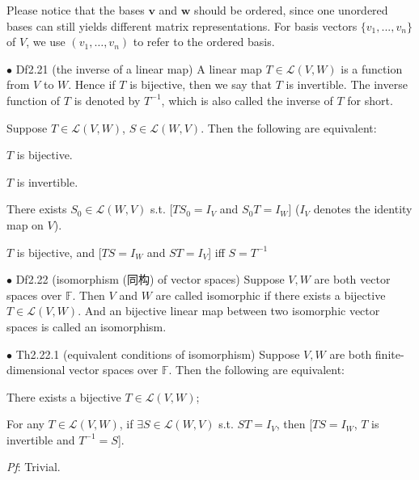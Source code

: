\documentclass{article}
\begin{document}
\begin{Rmk}{}
    Please notice that the bases $\pmb{v}$ and $\pmb{w}$ should be ordered, since one unordered bases can still yields different matrix representations. \textcolor{Df}{For basis vectors $\{v_1, ..., v_n\}$ of $V$, we use $(v_1, \dots, v_n)$ to refer to the ordered basis.}
\end{Rmk}

\begin{Df}{$\bullet$ Df2.21 (the inverse of a linear map)}
    A linear map $T\in\mathcal{L}(V, W)$ is a function from $V$ to $W$. Hence if $T$ is bijective, then we say that $T$ is invertible. The inverse function of $T$ is denoted by $T^{-1}$, which is also called the inverse of $T$ for short.
\end{Df}

\begin{Rmk}{}
    \textcolor{Th}{Suppose $T\in\mathcal{L}(V, W)$, $S\in\mathcal{L}(W, V)$. Then the following are equivalent:
    \begin{compactenum}
        \item $T$ is bijective.
        \item $T$ is invertible.
        \item There exists $S_0\in\mathcal{L}(W, V)$ s.t. [$TS_0 = I_V$ and $S_0T = I_W$] ($I_V$ denotes the identity map on $V$).
        \item $T$ is bijective, and [$TS = I_W$ and $ST = I_V$] iff $S = T^{-1}$ 
    \end{compactenum}}
\end{Rmk}

\begin{Df}{$\bullet$ Df2.22 (isomorphism (同构) of vector spaces)}
    Suppose $V, W$ are both vector spaces over $\mathbb{F}$. Then $V$ and $W$ are called isomorphic if there exists a bijective $T\in\mathcal{L}(V, W)$. And an bijective linear map between two isomorphic vector spaces is called an isomorphism.
\end{Df}

\begin{Th}{$\bullet$ Th2.22.1 (equivalent conditions of isomorphism)}
    Suppose $V, W$ are both finite-dimensional vector spaces over $\mathbb{F}$. Then the following are equivalent:
    \begin{compactenum}
        \item There exists a bijective $T\in\mathcal{L}(V, W)$;
        \item For any $T\in\mathcal{L}(V, W)$, if $\exists S\in\mathcal{L}(W, V)$ s.t. $ST = I_V$, then [$TS = I_W$, $T$ is invertible and $T^{-1} = S$]. 
    \end{compactenum}
    \textit{Pf}: Trivial.
\end{Th}
\end{document}
